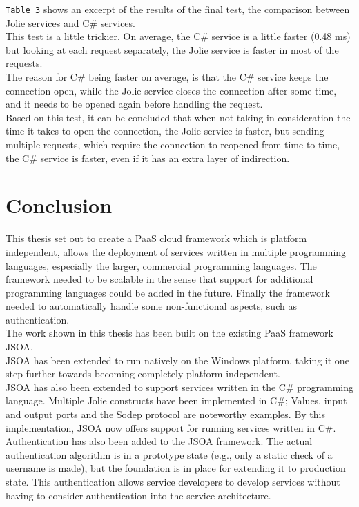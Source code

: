 \documentclass[12pt,a4paper]{article}
\begin{document}
\texttt{Table 3} shows an excerpt of the results of the final test, the comparison between Jolie services and C\# services.\\
This test is a little trickier. On average, the C\# service is a little faster (0.48 ms) but looking at each request separately, the Jolie service is faster in most of the requests. \\
The reason for C\# being faster on average, is that the C\# service keeps the connection open, while the Jolie service closes the connection after some time, and it needs to be opened again before handling the request. \\
Based on this test, it can be concluded that when not taking in consideration the time it takes to open the connection, the Jolie service is faster, but sending multiple requests, which require the connection to reopened from time to time, the C\# service is faster, even if it has an extra layer of indirection.

\newpage
\section{Conclusion}\label{sec:Conclusion}
This thesis set out to create a PaaS cloud framework which is platform independent, allows the deployment of services written in multiple programming languages, especially the larger, commercial programming languages. The framework needed to be scalable in the sense that support for additional programming languages could be added in the future. Finally the framework needed to automatically handle some non-functional aspects, such as authentication.\\

The work shown in this thesis has been built on the existing PaaS framework JSOA\cite{jsoa_website}.\\

JSOA has been extended to run natively on the Windows platform, taking it one step further towards becoming completely platform independent.\\
JSOA has also been extended to support services written in the C\# programming language. Multiple Jolie constructs have been implemented in C\#; Values, input and output ports and the Sodep protocol are noteworthy examples. By this implementation, JSOA now offers support for running services written in C\#.\\

Authentication has also been added to the JSOA framework. The actual authentication algorithm is in a prototype state (e.g., only a static check of a username is made), but the foundation is in place for extending it to production state. This authentication allows service developers to develop services without having to consider authentication into the service architecture.\\
\end{document}
